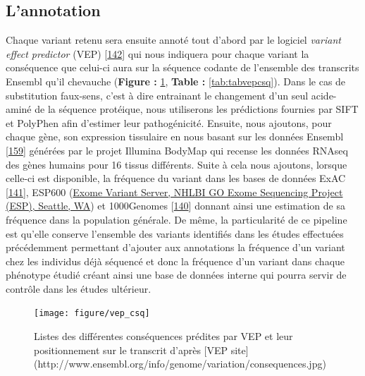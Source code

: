 \documentclass[12pt,twoside]{reedthesis}
\theoremstyle{definition}
\theoremstyle{definition}
\theoremstyle{remark}
\begin{document}
  \newpage
  
  \subsection{L'annotation}\label{lannotation}
  
  Chaque variant retenu sera ensuite annoté tout d'abord par le logiciel
  \emph{variant effect predictor} (VEP)
  {[}\protect\hyperlink{ref-McLaren2016}{142}{]} qui nous indiquera pour
  chaque variant la conséquence que celui-ci aura sur la séquence codante
  de l'ensemble des transcrits Ensembl qu'il chevauche (\textbf{Figure :
  }\ref{fig:figvepcsq}, \textbf{Table : }\ref{tab:tabvepcsq}). Dans le cas
  de substitution faux-sens, c'est à dire entrainant le changement d'un
  seul acide-aminé de la séquence protéique, nous utiliserons les
  prédictions fournies par SIFT et PolyPhen afin d'estimer leur
  pathogénicité. Ensuite, nous ajoutons, pour chaque gène, son expression
  tissulaire en nous basant sur les données Ensembl
  {[}\protect\hyperlink{ref-Aken2017}{159}{]} générées par le projet
  Illumina BodyMap qui recense les données RNAseq des gènes humains pour
  16 tissus différents. Suite à cela nous ajoutons, lorsque celle-ci est
  disponible, la fréquence du variant dans les bases de données ExAC
  {[}\protect\hyperlink{ref-Lek2016}{141}{]}, ESP600
  (\href{http://evs.gs.washington.edu/EVS/}{Exome Variant Server, NHLBI GO
  Exome Sequencing Project (ESP), Seattle, WA}) et 1000Genomes
  {[}\protect\hyperlink{ref-1000GenomesProjectConsortium2015}{140}{]}
  donnant ainsi une estimation de sa fréquence dans la population
  générale. De même, la particularité de ce pipeline est qu'elle conserve
  l'ensemble des variants identifiés dans les études effectuées
  précédemment permettant d'ajouter aux annotations la fréquence d'un
  variant chez les individus déjà séquencé et donc la fréquence d'un
  variant dans chaque phénotype étudié créant ainsi une base de données
  interne qui pourra servir de contrôle dans les études ultérieur.
  
  \begin{figure}
  
  {\centering \texttt{[image: figure/vep\_csq]} 
  
  }
  
  \caption[Listes des différentes conséquences prédites par VEP et leur positionnement sur le transcrit]{Listes des différentes conséquences prédites par VEP et leur positionnement sur le transcrit d'après [VEP site](http://www.ensembl.org/info/genome/variation/consequences.jpg)}\label{fig:figvepcsq}
  \end{figure}
  
\end{document}

